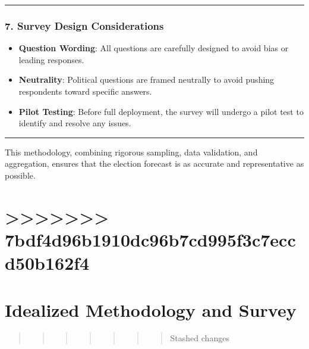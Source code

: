\documentclass[
  letterpaper,
  DIV=11,
  numbers=noendperiod]{scrartcl}
\providecommand{\tightlist}{%
  \setlength{\itemsep}{0pt}\setlength{\parskip}{0pt}}\usepackage{longtable,booktabs,array}
\begin{document}
\begin{center}\rule{0.5\linewidth}{0.5pt}\end{center}

\subsubsection{\texorpdfstring{\textbf{7. Survey Design
Considerations}}{7. Survey Design Considerations}}\label{survey-design-considerations}

\begin{itemize}
\tightlist
\item
  \textbf{Question Wording}: All questions are carefully designed to
  avoid bias or leading responses.
\item
  \textbf{Neutrality}: Political questions are framed neutrally to avoid
  pushing respondents toward specific answers.
\item
  \textbf{Pilot Testing}: Before full deployment, the survey will
  undergo a pilot test to identify and resolve any issues.
\end{itemize}

\begin{center}\rule{0.5\linewidth}{0.5pt}\end{center}

This methodology, combining rigorous sampling, data validation, and
aggregation, ensures that the election forecast is as accurate and
representative as possible.

\section{\textgreater\textgreater\textgreater\textgreater\textgreater\textgreater\textgreater{}
7bdf4d96b1910dc96b7cd995f3c7eccd50b162f4}\label{bdf4d96b1910dc96b7cd995f3c7eccd50b162f4}

\section{Idealized Methodology and
Survey}\label{idealized-methodology-and-survey}

\begin{quote}
\begin{quote}
\begin{quote}
\begin{quote}
\begin{quote}
\begin{quote}
\begin{quote}
Stashed changes
\end{quote}
\end{quote}
\end{quote}
\end{quote}
\end{quote}
\end{quote}
\end{quote}
\end{document}

